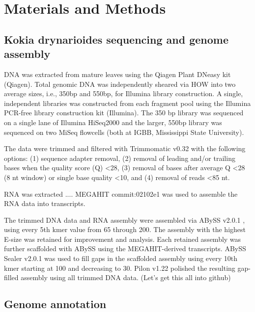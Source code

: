 \documentclass[10pt,letterpaper]{article}
\begin{document}
\section*{Materials and Methods}
\subsection*{Kokia drynarioides sequencing and genome assembly}

DNA was extracted from mature leaves using the Qiagen Plant DNeasy kit (Qiagen). Total genomic DNA was independently sheared via HOW into two average sizes, i.e., 350bp and 550bp, for Illumina library construction. A single, independent libraries was constructed from each fragment pool using the Illumina PCR-free library construction kit (Illumina). The 350 bp library was sequenced on a single lane of Illumina HiSeq2000 and the larger, 550bp library was sequenced on two MiSeq flowcells (both at IGBB, Mississippi State University). 

The data were trimmed and filtered with Trimmomatic v0.32 \cite{Bolger2014} with the following options: (1)
sequence adapter removal, (2) removal of leading and/or trailing bases when the
quality score (Q) <28, (3) removal of bases after average Q <28 (8 nt window) or
single base quality <10, and (4) removal of reads <85 nt.

RNA was extracted .... MEGAHIT commit:02102e1 \cite{Li2015} was used to assemble
the RNA data into transcripts.

The trimmed DNA data and RNA assembly were assembled via ABySS v2.0.1
\cite{Simpson2009}, using every 5th kmer value from 65 through 200. The assembly
with the highest E-size \cite{Salzberg2012} was retained for improvement and analysis. Each retained 
assembly was further scaffolded with ABySS using the MEGAHIT-derived 
transcripts. ABySS Sealer v2.0.1 \cite{Paulino2015} was used to fill gaps in the
scaffolded assembly using 
every 10th kmer starting at 100 and decreasing to 30. Pilon v1.22
\cite{Walker2014} polished the resulting gap-filled assembly using all 
trimmed DNA data. (Let's get this all into github)


\subsection*{Genome annotation}
\end{document}
